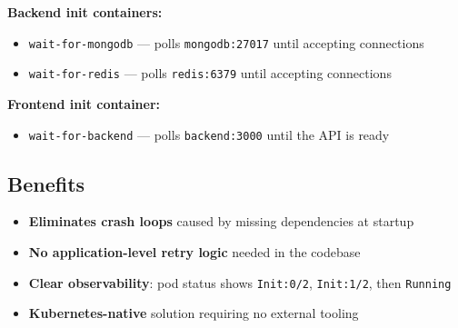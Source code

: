 \documentclass[12pt,a4paper]{report}
\begin{document}
\begin{center}
\end{center}

\textbf{Backend init containers:}
\begin{itemize}
  \item \texttt{wait-for-mongodb} --- polls \texttt{mongodb:27017} until accepting connections
  \item \texttt{wait-for-redis} --- polls \texttt{redis:6379} until accepting connections
\end{itemize}

\textbf{Frontend init container:}
\begin{itemize}
  \item \texttt{wait-for-backend} --- polls \texttt{backend:3000} until the API is ready
\end{itemize}

\subsection{Benefits}

\begin{itemize}
  \item \textbf{Eliminates crash loops} caused by missing dependencies at startup
  \item \textbf{No application-level retry logic} needed in the codebase
  \item \textbf{Clear observability}: pod status shows \texttt{Init:0/2}, \texttt{Init:1/2}, then \texttt{Running}
  \item \textbf{Kubernetes-native} solution requiring no external tooling
\end{itemize}
\end{document}

